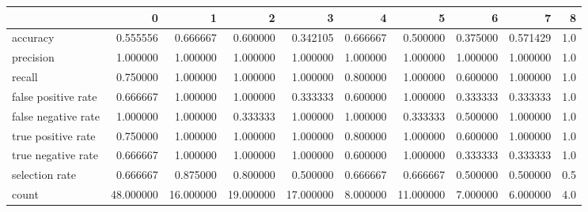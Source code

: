 \begin{tabular}{lrrrrrrrrr}
\toprule
{} &          0 &          1 &          2 &          3 &         4 &          5 &         6 &         7 &    8 \\
\midrule
accuracy            &   0.555556 &   0.666667 &   0.600000 &   0.342105 &  0.666667 &   0.500000 &  0.375000 &  0.571429 &  1.0 \\
precision           &   1.000000 &   1.000000 &   1.000000 &   1.000000 &  1.000000 &   1.000000 &  1.000000 &  1.000000 &  1.0 \\
recall              &   0.750000 &   1.000000 &   1.000000 &   1.000000 &  0.800000 &   1.000000 &  0.600000 &  1.000000 &  1.0 \\
false positive rate &   0.666667 &   1.000000 &   1.000000 &   0.333333 &  0.600000 &   1.000000 &  0.333333 &  0.333333 &  1.0 \\
false negative rate &   1.000000 &   1.000000 &   0.333333 &   1.000000 &  1.000000 &   0.333333 &  0.500000 &  1.000000 &  1.0 \\
true positive rate  &   0.750000 &   1.000000 &   1.000000 &   1.000000 &  0.800000 &   1.000000 &  0.600000 &  1.000000 &  1.0 \\
true negative rate  &   0.666667 &   1.000000 &   1.000000 &   1.000000 &  0.600000 &   1.000000 &  0.333333 &  0.333333 &  1.0 \\
selection rate      &   0.666667 &   0.875000 &   0.800000 &   0.500000 &  0.666667 &   0.666667 &  0.500000 &  0.500000 &  0.5 \\
count               &  48.000000 &  16.000000 &  19.000000 &  17.000000 &  8.000000 &  11.000000 &  7.000000 &  6.000000 &  4.0 \\
\bottomrule
\end{tabular}

